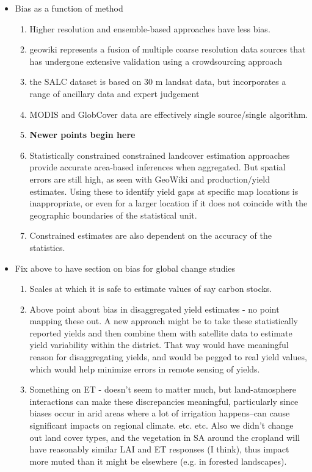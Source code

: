 \documentclass{pnastwo}
\begin{document}
\begin{article}
\begin{itemize}
\begin{enumerate}
\begin{itemize}
          \end{itemize}
    \end{enumerate}
  \item Bias as a function of method
      \begin{enumerate}
        \item Higher resolution and ensemble-based approaches have less bias.
        \item geowiki represents a fusion of multiple coarse resolution data sources that has undergone extensive validation using a crowdsourcing approach
        \item the SALC dataset is based on 30 m landsat data, but incorporates a range of ancillary data and expert judgement
        \item MODIS and GlobCover data are effectively single source/single algorithm.
        \item \textbf{Newer points begin here}
        \item Statistically constrained constrained landcover estimation approaches provide accurate area-based inferences when aggregated. But spatial errors are still high, as seen with GeoWiki and production/yield estimates. Using these to identify yield gaps at specific map locations is inappropriate, or even for a larger location if it does not coincide with the geographic boundaries of the statistical unit.  
        \item Constrained estimates are also dependent on the accuracy of the statistics.  
    \end{enumerate}
  \item Fix above to have section on bias for global change studies
    \begin{enumerate}
      \item Scales at which it is safe to estimate values of say carbon stocks. 
      \item Above point about bias in disaggregated yield estimates - no point mapping these out. A new approach might be to take these statistically reported yields and then combine them with satellite data to estimate yield variability within the district.  That way would have meaningful reason for disaggregating yields, and would be pegged to real yield values, which would help minimize errors in remote sensing of yields. 
      \item Something on ET - doesn't seem to matter much, but land-atmosphere interactions can make these discrepancies meaningful, particularly since biases occur in arid areas where a lot of irrigation happens--can cause significant impacts on regional climate.  etc. etc. Also we didn't change out land cover types, and the vegetation in SA around the cropland will have reasonably similar LAI and ET responses (I think), thus impact more muted than it might be elsewhere (e.g. in forested landscapes).  

\end{enumerate}
\end{itemize}
\end{article}
\end{document}
